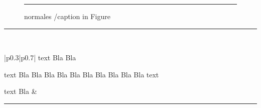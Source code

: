 \documentclass[12pt]{scrartcl}
\begin{document}
\begin{figure}\rule{2cm}{1cm}\caption{normales /caption in Figure}\end{figure}

\rule{3cm}{2cm}\\ 

\begin{longtable}{|p{0.3\textwidth}|p{0.7\textwidth}|}\hline
text Bla Bla \par text Bla Bla Bla Bla Bla Bla Bla Bla Bla Bla text  \par text Bla 
&
\begin{minipage}[t]{\linewidth}%
  \vspace{0.1mm}\centering\rule{3cm}{3cm}%
  \vspace{0.1mm}%
  \end{minipage}\\
\hline
\end{longtable}

\listoffigures
\end{document}
